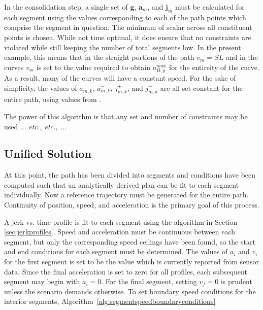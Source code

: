 \documentclass[letterpaper, 10 pt, conference]{ieeeconf}  %
\begin{document}
In the consolidation step, a single set of $\mathbf{g}$, $\mathbf{a}_m$, and $\mathbf{j}_m$ must be calculated for each segment using the values corresponding to each of the path points which comprise the segment in question.
The minimum of scalar across all constituent points is chosen.
While not time optimal, it does ensure that no constraints are violated while still keeping the number of total segments low.
In the present example, this means that in the straight portions of the path $v_m = SL$ and in the curves $v_m$ is set to the value required to obtain $a_{B,y}^{max}$ for the entireity of the curve.
As a result, many of the curves will have a constant speed.
For the sake of simplicity, the values of $a^+_{m,k}$, $a^-_{m,k}$, $j^+_{m,k}$, and $j^-_{m,k}$ are all set constant for the entire path, using values from \cite{Maurya2012,Hoberock1977,Long2000}.


The power of this algorithm is that any set and number of constraints may be used ... \emph{etc., etc., ...}\tabularnewline


\subsection{Unified Solution} \label{sec:unifiedsolution}

At this point, the path has been divided into segments and conditions have been computed such that an analytically derived plan can be fit to each segment individually.
Now a reference trajectory must be generated for the entire path.
Continuity of position, speed, and acceleration is the primary goal of this process.

A jerk vs. time profile is fit to each segment using the algorithm in Section \ref{sec:jerkprofiles}.
Speed and acceleration must be continuous between each segment, but only the corresponding speed ceilings have been found, so the start and end conditions for each segment must be determined.
The values of $a_i$ and $v_i$ for the first segment is set to be the value which is currently reported from sensor data.
Since the final acceleration is set to zero for all profiles, each subsequent segment may begin with $a_i = 0$.
For the final segment, setting $v_f = 0$ is prudent unless the scenario demands otherwise.
To set boundary speed conditions for the interior segments, Algorithm~\ref{alg:segmentspeedboundaryconditions}
\end{document}
